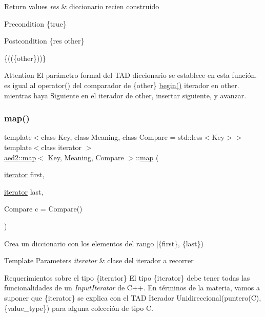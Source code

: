 \begin{DoxyRetVals}{Return values}
{\em res} & diccionario recien construido\\
\hline
\end{DoxyRetVals}
\begin{DoxyPrecond}{Precondition}
\{true\} 
\end{DoxyPrecond}
\begin{DoxyPostcond}{Postcondition}
\{res  other\}
\end{DoxyPostcond}
\{((\{other\}))\}

\begin{DoxyAttention}{Attention}
El parámetro formal  del T\+AD diccionario se establece en esta función.  es igual al operator() del comparador de \{other\} \hyperlink{classaed2_1_1map_a58a95705d54b3dda7f775ce5a22225cb}{begin()} iterador en other. mientras haya Siguiente en el iterador de other, insertar siguiente, y avanzar. 
\end{DoxyAttention}
\mbox{\label{classaed2_1_1map_a5d336f3248572beb56be383dcc95cfeb}} 
\subsubsection{\texorpdfstring{map()}{map()}\hspace{0.1cm}{\footnotesize\ttfamily [6/6]}}
{\footnotesize\ttfamily template$<$class Key, class Meaning, class Compare = std\+::less$<$\+Key$>$$>$ \\
template$<$class iterator $>$ \\
\hyperlink{classaed2_1_1map}{aed2\+::map}$<$ Key, Meaning, Compare $>$\+::\hyperlink{classaed2_1_1map}{map} (\begin{DoxyParamCaption}\item[{\hyperlink{classaed2_1_1map_1_1iterator}{iterator}}]{first,  }\item[{\hyperlink{classaed2_1_1map_1_1iterator}{iterator}}]{last,  }\item[{Compare}]{c = {\ttfamily Compare()} }\end{DoxyParamCaption})\hspace{0.3cm}{\ttfamily [inline]}}



Crea un diccionario con los elementos del rango \mbox{[}\{first\}, \{last\}) 


\begin{DoxyTemplParams}{Template Parameters}
{\em iterator} & clase del iterador a recorrer\\
\hline
\end{DoxyTemplParams}
\begin{DoxyParagraph}{Requerimientos sobre el tipo \{iterator\}}
El tipo \{iterator\} debe tener todas las funcionalidades de un {\itshape Input\+Iterator} de C++. En términos de la materia, vamos a suponer que \{iterator\} se explica con el T\+AD Iterador Unidireccional(puntero(\+C), \{value\+\_\+type\}) para alguna colección de tipo C.
\end{DoxyParagraph}

